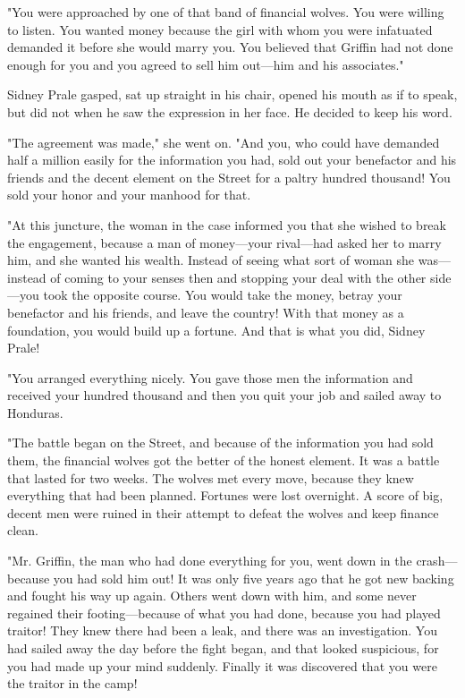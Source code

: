 \documentclass{novel}
\begin{document}
"You were approached by one of that band of financial wolves. You were willing to listen. You wanted money because the girl with whom you were infatuated demanded it before she would marry you. You believed that Griffin had not done enough for you and you agreed to sell him out---him and his associates."

Sidney Prale gasped, sat up straight in his chair, opened his mouth as if to speak, but did not when he saw the expression in her face. He decided to keep his word.

"The agreement was made," she went on. "And you, who could have demanded half a million easily for the information you had, sold out your benefactor and his friends and the decent element on the Street for a paltry hundred thousand! You sold your honor and your manhood for that.

"At this juncture, the woman in the case informed you that she wished to break the engagement, because a man of money---your rival---had asked her to marry him, and she wanted his wealth. Instead of seeing what sort of woman she was---instead of coming to your senses then and stopping your deal with the other side---you took the opposite course. You would take the money, betray your benefactor and his friends, and leave the country! With that money as a foundation, you would build up a fortune. And that is what you did, Sidney Prale!

"You arranged everything nicely. You gave those men the information and received your hundred thousand and then you quit your job and sailed away to Honduras.

"The battle began on the Street, and because of the information you had sold them, the financial wolves got the better of the honest element. It was a battle that lasted for two weeks. The wolves met every move, because they knew everything that had been planned. Fortunes were lost overnight. A score of big, decent men were ruined in their attempt to defeat the wolves and keep finance clean.

"Mr. Griffin, the man who had done everything for you, went down in the crash---because you had sold him out! It was only five years ago that he got new backing and fought his way up again. Others went down with him, and some never regained their footing---because of what you had done, because you had played traitor! They knew there had been a leak, and there was an investigation. You had sailed away the day before the fight began, and that looked suspicious, for you had made up your mind suddenly. Finally it was discovered that you were the traitor in the camp!
\end{document}

